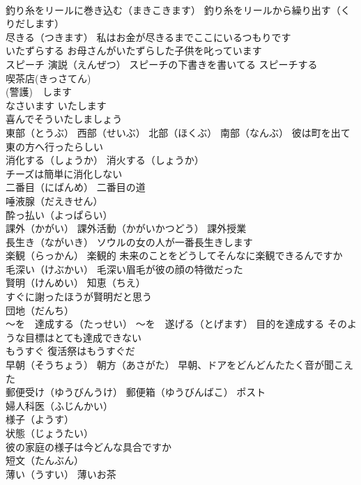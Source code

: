 \documentclass[8pt]{extreport}
\begin{document}
\begin{CJK}{UTF8}{min}
\\	釣り糸をリールに巻き込む（まきこきます） 釣り糸をリールから繰り出す（くりだします）
\\	尽きる（つきます） 私はお金が尽きるまでここにいるつもりです
\\	いたずらする お母さんがいたずらした子供を叱っています
\\	スピーチ 演説（えんぜつ） スピーチの下書きを書いてる スピーチする
\\	喫茶店(きっさてん)
\\	(警護)　します　
\\	なさいます いたします 
\\	喜んでそういたしましょう
\\	東部（とうぶ） 西部（せいぶ） 北部（ほくぶ） 南部（なんぶ） 彼は町を出て東の方へ行ったらしい
\\	消化する（しょうか） 消火する（しょうか）
\\	チーズは簡単に消化しない
\\	二番目（にばんめ） 二番目の道
\\	唾液腺（だえきせん）
\\	酔っ払い（よっぱらい）
\\	課外（かがい） 課外活動（かがいかつどう） 課外授業
\\	長生き（ながいき） ソウルの女の人が一番長生きします
\\	楽観（らっかん） 楽観的 未来のことをどうしてそんなに楽観できるんですか
\\	毛深い（けぶかい） 毛深い眉毛が彼の顔の特徴だった
\\	賢明（けんめい） 知恵（ちえ）
\\	すぐに謝ったほうが賢明だと思う
\\	団地（だんち）
\\	～を　達成する（たっせい） ～を　遂げる（とげます） 目的を達成する そのような目標はとても達成できない
\\	もうすぐ 復活祭はもうすぐだ
\\	早朝（そうちょう） 朝方（あさがた） 早朝、ドアをどんどんたたく音が聞こえた
\\	郵便受け（ゆうびんうけ） 郵便箱（ゆうびんばこ） ポスト
\\	婦人科医（ふじんかい）
\\	様子（ようす） 
\\	状態（じょうたい）
\\	彼の家庭の様子は今どんな具合ですか
\\	短文（たんぶん）
\\	薄い（うすい） 薄いお茶

\end{CJK}
\end{document}
